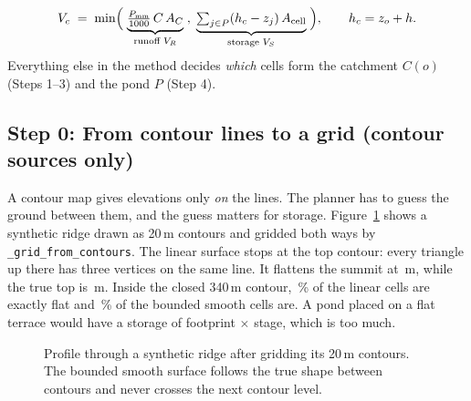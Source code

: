 \documentclass[11pt,a4paper]{article}
\newcommand{\gen}[1]{}
\newcommand{\code}[1]{\texttt{#1}}
\begin{document}
\begin{keybox}[title=The whole calculation in one line]
\[
V_c \;=\; \min\Bigl(\;\underbrace{\tfrac{P_{\mathrm{mm}}}{1000}\,C\,A_C}_{\text{runoff } V_R}\;,\;\underbrace{\textstyle\sum_{j\in P}(h_c-z_j)\,A_{\mathrm{cell}}}_{\text{storage } V_S}\;\Bigr),
\qquad h_c = z_o + h .
\]
Everything else in the method decides \emph{which} cells form the catchment $C(o)$ (Steps 1--3) and the pond $P$ (Step 4).
\end{keybox}

\subsection*{Step 0: From contour lines to a grid (contour sources only)}
A contour map gives elevations only \emph{on} the lines. The planner has to guess the ground between them, and the guess matters for storage. Figure~\ref{fig:interp} shows a synthetic ridge drawn as 20\,m contours and gridded both ways by \code{\_grid\_from\_contours}. The linear surface stops at the top contour: every triangle up there has three vertices on the same line. It flattens the summit at \WElinpeak\,m, while the true top is \WEtruepeak\,m. Inside the closed 340\,m contour, \WEflatlinear\,\% of the linear cells are exactly flat and \WEflatsmooth\,\% of the bounded smooth cells are. A pond placed on a flat terrace would have a storage of footprint $\times$ stage, which is too much.

\begin{figure}[htbp]
\centering
{}
\caption{Profile through a synthetic ridge after gridding its 20\,m contours. The bounded smooth surface follows the true shape between contours and never crosses the next contour level.}
\label{fig:interp}
\end{figure}
\end{document}
